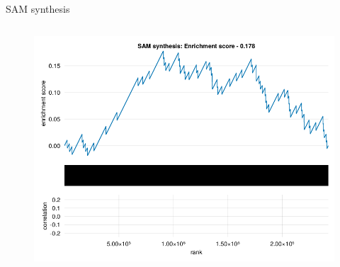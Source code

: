 \begin{frame}{SAM synthesis}
    \begin{columns}[c] %

        \begin{figure}
            \includegraphics[width=1\linewidth]{../figures/fsea_SAM-synthesis.png}
        \end{figure}

    \end{columns}

\end{frame}

